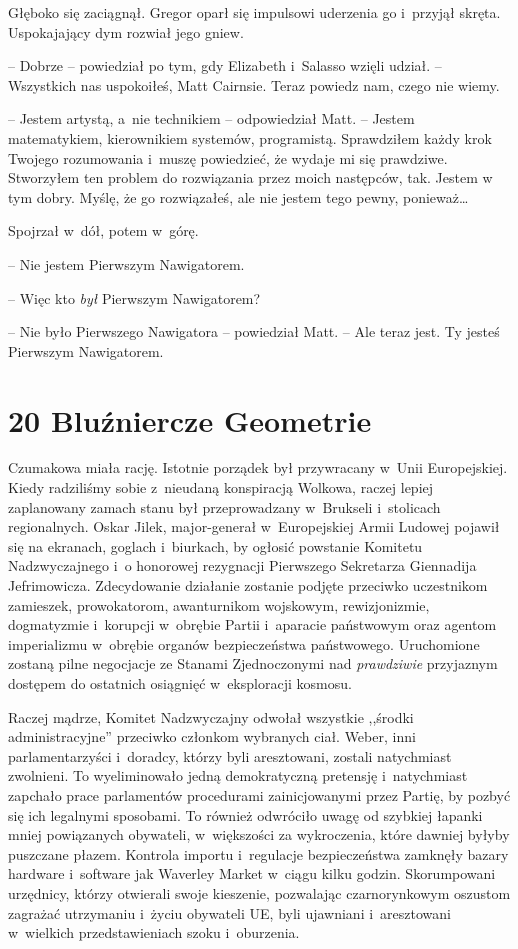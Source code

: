 \documentclass[oneside,polish,12pt,sfheadings]{mwbk}
\begin{document}
Głęboko się zaciągnął. Gregor oparł się impulsowi uderzenia go i~przyjął
skręta. Uspokajający dym rozwiał jego gniew.

-- Dobrze -- powiedział po tym, gdy Elizabeth i~Salasso wzięli udział. --
Wszystkich nas uspokoiłeś, Matt Cairnsie. Teraz powiedz nam, czego nie
wiemy.

-- Jestem artystą, a~nie technikiem -- odpowiedział Matt. -- Jestem
matematykiem, kierownikiem systemów, programistą. Sprawdziłem każdy krok
Twojego rozumowania i~muszę powiedzieć, że wydaje mi się prawdziwe.
Stworzyłem ten problem do rozwiązania przez moich następców, tak. Jestem
w tym dobry. Myślę, że go rozwiązałeś, ale nie jestem tego pewny,
ponieważ\ldots

Spojrzał w~dół, potem w~górę. 

-- Nie jestem Pierwszym Nawigatorem.

-- Więc kto \emph{był} Pierwszym Nawigatorem?

-- Nie było Pierwszego Nawigatora -- powiedział Matt. -- Ale teraz jest. Ty
jesteś Pierwszym Nawigatorem.



\chapter[Bluźniercze Geometrie]{20 Bluźniercze Geometrie}

Czumakowa miała rację. Istotnie porządek był przywracany w~Unii
Europejskiej. Kiedy radziliśmy sobie z~nieudaną konspiracją Wolkowa,
raczej lepiej zaplanowany zamach stanu był przeprowadzany w~Brukseli i~stolicach regionalnych. Oskar Jilek, major-generał w~Europejskiej Armii
Ludowej pojawił się na ekranach, goglach i~biurkach, by ogłosić
powstanie Komitetu Nadzwyczajnego i~o honorowej rezygnacji Pierwszego
Sekretarza Giennadija Jefrimowicza. Zdecydowanie działanie zostanie
podjęte przeciwko uczestnikom zamieszek, prowokatorom, awanturnikom
wojskowym, rewizjonizmie, dogmatyzmie i~korupcji w~obrębie Partii i~aparacie państwowym oraz agentom imperializmu w~obrębie organów
bezpieczeństwa państwowego. Uruchomione zostaną pilne negocjacje ze
Stanami Zjednoczonymi nad \emph{prawdziwie } przyjaznym dostępem do
ostatnich osiągnięć w~eksploracji kosmosu.

Raczej mądrze, Komitet Nadzwyczajny odwołał wszystkie ,,środki
administracyjne'' przeciwko członkom wybranych ciał. Weber, inni
parlamentarzyści i~doradcy, którzy byli aresztowani, zostali natychmiast
zwolnieni. To wyeliminowało jedną demokratyczną pretensję i~natychmiast
zapchało prace parlamentów procedurami zainicjowanymi przez Partię, by
pozbyć się ich legalnymi sposobami. To również odwróciło uwagę od
szybkiej łapanki mniej powiązanych obywateli, w~większości za
wykroczenia, które dawniej byłyby puszczane płazem. Kontrola importu i~regulacje bezpieczeństwa zamknęły bazary hardware i~software jak
Waverley Market w~ciągu kilku godzin. Skorumpowani urzędnicy, którzy
otwierali swoje kieszenie, pozwalając czarnorynkowym oszustom zagrażać
utrzymaniu i~życiu obywateli UE, byli ujawniani i~aresztowani w~wielkich
przedstawieniach szoku i~oburzenia.
\end{document}
